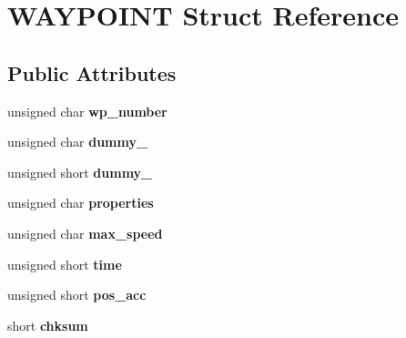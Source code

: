\hypertarget{struct_w_a_y_p_o_i_n_t}{\section{W\-A\-Y\-P\-O\-I\-N\-T Struct Reference}
\label{struct_w_a_y_p_o_i_n_t}
}
\subsection*{Public Attributes}
\begin{DoxyCompactItemize}
\item 
\hypertarget{struct_w_a_y_p_o_i_n_t_a99ce6032f6a397660d743d82ddf7a192}{unsigned char {\bfseries wp\-\_\-number}}\label{struct_w_a_y_p_o_i_n_t_a99ce6032f6a397660d743d82ddf7a192}

\item 
\hypertarget{struct_w_a_y_p_o_i_n_t_a9b594975109d3d8997114a1dd9ab59ac}{unsigned char {\bfseries dummy\-\_}}\label{struct_w_a_y_p_o_i_n_t_a9b594975109d3d8997114a1dd9ab59ac}

\item 
\hypertarget{struct_w_a_y_p_o_i_n_t_a85af50eacd17bfa5e664c0c872a9afcf}{unsigned short {\bfseries dummy\-\_}}\label{struct_w_a_y_p_o_i_n_t_a85af50eacd17bfa5e664c0c872a9afcf}

\item 
\hypertarget{struct_w_a_y_p_o_i_n_t_ad1edec7024c63a04cd8152ee94686996}{unsigned char {\bfseries properties}}\label{struct_w_a_y_p_o_i_n_t_ad1edec7024c63a04cd8152ee94686996}

\item 
\hypertarget{struct_w_a_y_p_o_i_n_t_a0516b0c661b100a7e533660d5231dd6a}{unsigned char {\bfseries max\-\_\-speed}}\label{struct_w_a_y_p_o_i_n_t_a0516b0c661b100a7e533660d5231dd6a}

\item 
\hypertarget{struct_w_a_y_p_o_i_n_t_a7d0e04a76033e9c1e0220188457c247d}{unsigned short {\bfseries time}}\label{struct_w_a_y_p_o_i_n_t_a7d0e04a76033e9c1e0220188457c247d}

\item 
\hypertarget{struct_w_a_y_p_o_i_n_t_aca48d89c6a35d88a4754e49154b2d6cc}{unsigned short {\bfseries pos\-\_\-acc}}\label{struct_w_a_y_p_o_i_n_t_aca48d89c6a35d88a4754e49154b2d6cc}

\item 
\hypertarget{struct_w_a_y_p_o_i_n_t_aae314df4361ce169ab9263827fd08314}{short {\bfseries chksum}}\label{struct_w_a_y_p_o_i_n_t_aae314df4361ce169ab9263827fd08314}


\end{DoxyCompactItemize}
